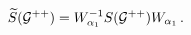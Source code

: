 \begin{equation}
\label{conjugation}
\widetilde S({\cal G}^{++})= W_{\alpha_1}^{-1}S({\cal G}^{++}) W_{\alpha_1}\, .
\end{equation} 
